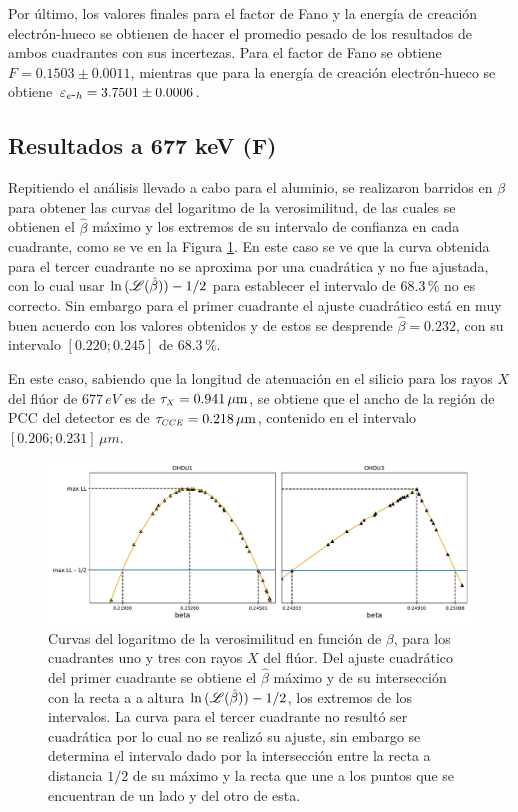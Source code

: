 Por último, los valores finales para el factor de Fano y la energía de creación electrón-hueco se obtienen de hacer el promedio pesado de los resultados de ambos cuadrantes con sus incertezas. Para el factor de Fano se obtiene $ F = 0.1503 \pm 0.0011 $, mientras que para la energía de creación electrón-hueco se obtiene $\varepsilon_{e\mbox{-}h} = 3.7501 \pm 0.0006 $.
\pagebreak
\subsection{Resultados a 677 keV (F)}
\noindent Repitiendo el análisis llevado a cabo para el aluminio, se realizaron barridos en $\beta$ para obtener las curvas del logaritmo de la verosimilitud, de las cuales se obtienen el $\hat{\beta}$ máximo y los extremos de su intervalo de confianza en cada cuadrante, como se ve en la Figura \ref{fig:F_barridos_beta}. %
En este caso se ve que la curva obtenida para el tercer cuadrante no se aproxima por una cuadrática y no fue ajustada, con lo cual usar $\ln{(\mathscr{L}(\hat{\beta}))} - 1/2$ para establecer el intervalo de $68.3\,\%$ no es correcto. %
Sin embargo para el primer cuadrante el ajuste cuadrático está en muy buen acuerdo con los valores obtenidos y de estos se desprende $\hat{\beta} = 0.232$, con su intervalo $[0.220; 0.245]$ de $68.3\,\%$.

En este caso, sabiendo que la longitud de atenuación en el silicio para los rayos $X$ del flúor de $677\,\si{eV}$ es de $\tau_{\scaleto{X}{4pt}} = 0.941\,\si{\mu m}$\cite{AttenuationLength}, se obtiene que el ancho de la región de PCC del detector es de $\tau_{\scaleto{CCE}{4pt}} = 0.218\,\si{\mu m}$, contenido en el intervalo $[0.206; 0.231]\,\si{\mu m}$.
\begin{figure}[h]
    \centering
    \includegraphics[scale=0.5]{Figs/F_barridos_beta.pdf}
    \caption{Curvas del logaritmo de la verosimilitud en función de $\beta$, para los cuadrantes uno y tres con rayos $X$ del flúor. Del ajuste cuadrático del primer cuadrante se obtiene el $\hat{\beta}$ máximo y de su intersección con la recta a a altura $\ln{(\mathscr{L}(\hat{\beta}))} - 1/2$, los extremos de los intervalos. La curva para el tercer cuadrante no resultó ser cuadrática por lo cual no se realizó su ajuste, sin embargo se determina el intervalo dado por la intersección entre la recta a distancia $1/2$ de su máximo y la recta que une a los puntos que se encuentran de un lado y del otro de esta.}
    \label{fig:F_barridos_beta}
\end{figure}


